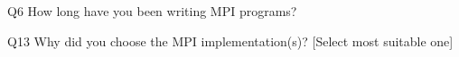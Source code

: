 \begin{description}%
\item{Q6} How long have you been writing MPI programs?%
\item{Q13} Why did you choose the MPI implementation(s)? [Select most suitable one]%
\end{description}%
